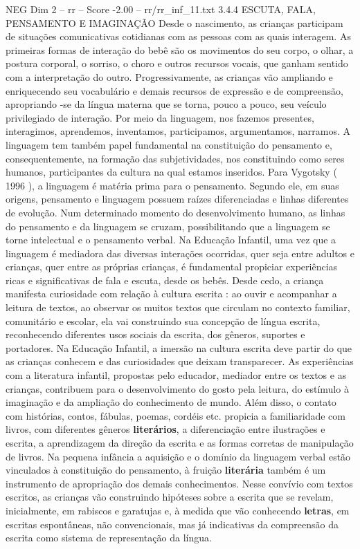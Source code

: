 \begin{textsample}{NEG Dim 2 – rr – Score -2.00 – rr/rr\_inf\_11.txt}  \label{ex:f2_neg_181}
3.4.4 ESCUTA, FALA, PENSAMENTO E IMAGINAÇÃO Desde o nascimento, as crianças participam de situações comunicativas cotidianas com as pessoas com as quais interagem.
As primeiras formas de interação do bebê são os movimentos do seu corpo, o olhar, a postura corporal, o sorriso, o choro e outros recursos vocais, que ganham sentido com a interpretação do outro.
Progressivamente, as crianças vão ampliando e enriquecendo seu vocabulário e demais recursos de expressão e de compreensão, apropriando -se da língua materna que se torna, pouco a pouco, seu veículo privilegiado de interação.
Por meio da linguagem, nos fazemos presentes, interagimos, aprendemos, inventamos, participamos, argumentamos, narramos.
A linguagem tem também papel fundamental na constituição do pensamento e, consequentemente, na formação das subjetividades, nos constituindo como seres humanos, participantes da cultura na qual estamos inseridos.
Para Vygotsky ( 1996 ), a linguagem é matéria prima para o pensamento.
Segundo ele, em suas origens, pensamento e linguagem possuem raízes diferenciadas e linhas diferentes de evolução.
Num determinado momento do desenvolvimento humano, as linhas do pensamento e da linguagem se cruzam, possibilitando que a linguagem se torne intelectual e o pensamento verbal.
Na Educação Infantil, uma vez que a linguagem é mediadora das diversas interações ocorridas, quer seja entre adultos e crianças, quer entre as próprias crianças, é fundamental propiciar experiências ricas e significativas de fala e escuta, desde os bebês.
Desde cedo, a criança manifesta curiosidade com relação à cultura escrita : ao ouvir e acompanhar a leitura de textos, ao observar os muitos textos que circulam no contexto familiar, comunitário e escolar, ela vai construindo sua concepção de língua escrita, reconhecendo diferentes usos sociais da escrita, dos gêneros, suportes e portadores.
Na Educação Infantil, a imersão na cultura escrita deve partir do que as crianças conhecem e das curiosidades que deixam transparecer.
As experiências com a literatura infantil, propostas pelo educador, mediador entre os textos e as crianças, contribuem para o desenvolvimento do gosto pela leitura, do estímulo à imaginação e da ampliação do conhecimento de mundo.
Além disso, o contato com histórias, contos, fábulas, poemas, cordéis etc. propicia a familiaridade com livros, com diferentes gêneros \textbf{literários}, a diferenciação entre ilustrações e escrita, a aprendizagem da direção da escrita e as formas corretas de manipulação de livros.
Na pequena infância a aquisição e o domínio da linguagem verbal estão vinculados à constituição do pensamento, à fruição \textbf{literária} também é um instrumento de apropriação dos demais conhecimentos.
Nesse convívio com textos escritos, as crianças vão construindo hipóteses sobre a escrita que se revelam, inicialmente, em rabiscos e garatujas e, à medida que vão conhecendo \textbf{letras}, em escritas espontâneas, não convencionais, mas já indicativas da compreensão da escrita como sistema de representação da língua.

\end{textsample}
